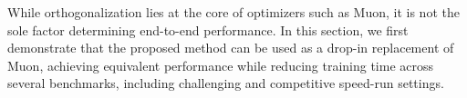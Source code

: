 While orthogonalization lies at the core of optimizers such as Muon, it is not the sole factor determining end-to-end performance. In this section, we first demonstrate that the proposed method can be used as a drop-in replacement of Muon, achieving equivalent performance while reducing training time across several benchmarks, including challenging and competitive speed-run settings. 
